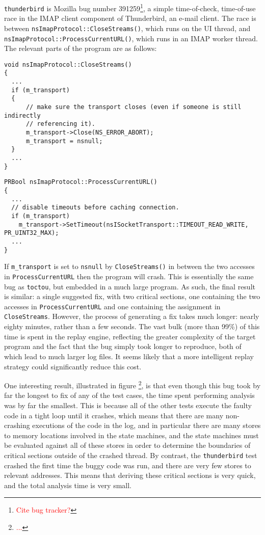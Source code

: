 \documentclass[10pt,twocolumn,preprint,natbib,authoryear]{sigplanconf}
\newcommand{\editorial}[1]{\textcolor{red}{\footnote{\textcolor{red}{#1}}}}
\begin{document}
\verb|thunderbird| is Mozilla bug number 391259\editorial{Cite bug
  tracker?}, a simple time-of-check, time-of-use race in the IMAP
client component of Thunderbird, an e-mail client.  The race is
between \verb|nsImapProtocol::CloseStreams()|, which runs on the UI
thread, and \verb|nsImapProtocol::ProcessCurrentURL()|, which runs in
an IMAP worker thread.  The relevant parts of the program are as
follows:

\begin{verbatim}
void nsImapProtocol::CloseStreams()
{
  ...
  if (m_transport)
  {
      // make sure the transport closes (even if someone is still indirectly
      // referencing it).
      m_transport->Close(NS_ERROR_ABORT);
      m_transport = nsnull;
  }
  ...
}
\end{verbatim}

\begin{verbatim}
PRBool nsImapProtocol::ProcessCurrentURL()
{
  ...
  // disable timeouts before caching connection.
  if (m_transport)
    m_transport->SetTimeout(nsISocketTransport::TIMEOUT_READ_WRITE, PR_UINT32_MAX);
  ...
}
\end{verbatim}

If \verb|m_transport| is set to \verb|nsnull| by \verb|CloseStreams()|
in between the two accesses in \verb|ProcessCurrentURL| then the
program will crash.  This is essentially the same bug as
\verb|toctou|, but embedded in a much large program.  As such, the
final result is similar: a single suggested fix, with two critical
sections, one containing the two accesses in \verb|ProcessCurrentURL|
and one containing the assignment in \verb|CloseStreams|.  However,
the process of generating a fix takes much longer: nearly eighty
minutes, rather than a few seconds.  The vast bulk (more than 99\%) of
this time is spent in the replay engine, reflecting the greater
complexity of the target program and the fact that the bug simply took
longer to reproduce, both of which lead to much larger log files.  It
seems likely that a more intelligent replay strategy could
significantly reduce this cost.

One interesting result, illustrated in figure \editorial{...}, is that
even though this bug took by far the longest to fix of any of the test
cases, the time spent performing analysis was by far the smallest.
This is because all of the other tests execute the faulty code in a
tight loop until it crashes, which means that there are many
non-crashing executions of the code in the log, and in particular
there are many stores to memory locations involved in the state
machines, and the state machines must be evaluated against all of
these stores in order to determine the boundaries of critical sections
outside of the crashed thread.  By contrast, the \verb|thunderbird|
test crashed the first time the buggy code was run, and there are very
few stores to relevant addresses.  This means that deriving these
critical sections is very quick, and the total analysis time is very
small.
\end{document}
